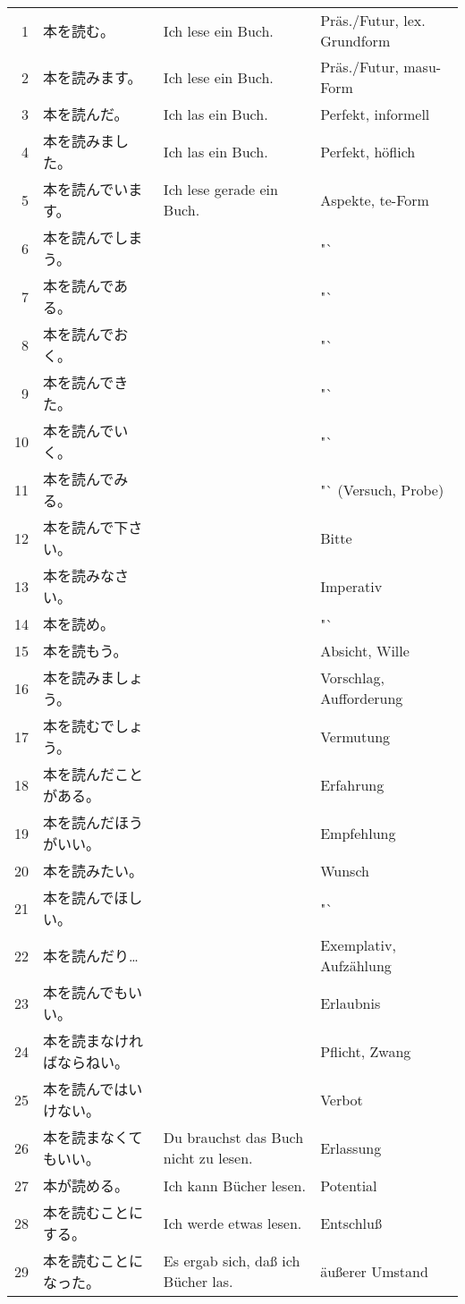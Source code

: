 \documentclass[justified, a4paper, notitlepage, captions=tableheading, nobib]{tufte-handout}
\begin{document}
\begin{center}
\begin{tabular}{rlll}
1 & 本を読む。 & Ich lese ein Buch. & Präs./Futur, lex. Grundform\\
2 & 本を読みます。 & Ich lese ein Buch. & Präs./Futur, masu-Form\\
3 & 本を読んだ。 & Ich las ein Buch. & Perfekt, informell\\
4 & 本を読みました。 & Ich las ein Buch. & Perfekt, höflich\\
5 & 本を読んでいます。 & Ich lese gerade ein Buch. & Aspekte, te-Form\\
6 & 本を読んでしまう。 &  & "`\\
7 & 本を読んである。 &  & "`\\
8 & 本を読んでおく。 &  & "`\\
9 & 本を読んできた。 &  & "`\\
10 & 本を読んでいく。 &  & "`\\
11 & 本を読んでみる。 &  & "` (Versuch, Probe)\\
12 & 本を読んで下さい。 &  & Bitte\\
13 & 本を読みなさい。 &  & Imperativ\\
14 & 本を読め。 &  & "`\\
15 & 本を読もう。 &  & Absicht, Wille\\
16 & 本を読みましょう。 &  & Vorschlag, Aufforderung\\
17 & 本を読むでしょう。 &  & Vermutung\\
18 & 本を読んだことがある。 &  & Erfahrung\\
19 & 本を読んだほうがいい。 &  & Empfehlung\\
20 & 本を読みたい。 &  & Wunsch\\
21 & 本を読んでほしい。 &  & "`\\
22 & 本を読んだり… &  & Exemplativ, Aufzählung\\
23 & 本を読んでもいい。 &  & Erlaubnis\\
24 & 本を読まなければならねい。 &  & Pflicht, Zwang\\
25 & 本を読んではいけない。 &  & Verbot\\
26 & 本を読まなくてもいい。 & Du brauchst das Buch nicht zu lesen. & Erlassung\\
27 & 本が読める。 & Ich kann Bücher lesen. & Potential\\
28 & 本を読むことにする。 & Ich werde etwas lesen. & Entschluß\\
29 & 本を読むことになった。 & Es ergab sich, daß ich Bücher las. & äußerer Umstand\\

\end{tabular}
\end{center}
\end{document}
